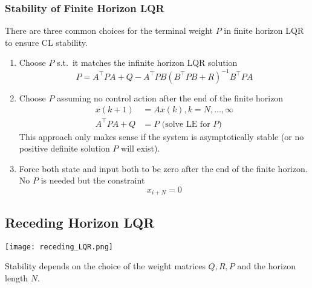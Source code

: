 \subsubsection{Stability of Finite Horizon LQR}

There are three common choices for the terminal weight $P$ in finite horizon LQR to ensure CL stability.
\begin{enumerate}
    \item Choose $P$ s.t.\ it matches the infinite horizon LQR solution
          \begin{equation*}
              P=A^\top PA+Q-A^\top PB{(B^\top PB+R)}^{-1}B^\top PA
          \end{equation*}
    \item Choose $P$ assuming no control action after the end of the finite horizon
          \begin{align*}
              x(k+1)        & =Ax(k),k=N,\dots ,\infty      \\
              A^{\top}PA +Q & = P\text{ (solve LE for $P$)}
          \end{align*}
          This approach only makes sense if the system is asymptotically stable (or no positive definite solution $P$ will exist).
    \item Force both state and input both to be zero after the end of the finite horizon. No $P$ is needed but the constraint
          \begin{equation*}
              x_{i+N} = 0
          \end{equation*}
\end{enumerate}

\subsection{Receding Horizon LQR}


\begin{center}
    \texttt{[image: receding\_LQR.png]}
\end{center}

\newpar{}

Stability depends on the choice of the weight matrices $Q, R, P$ and the horizon length $N$.

